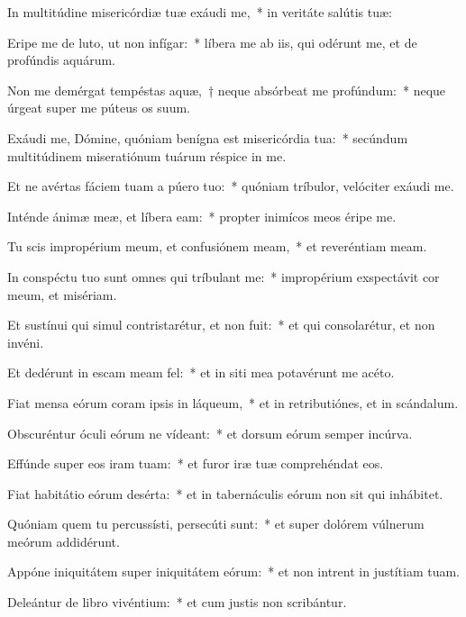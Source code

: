 
\item In multitúdine misericórdiæ tuæ exáudi me,~* in veritáte salútis tuæ:

\item Eripe me de luto, ut non infígar:~* líbera me ab iis, qui odérunt me, et de profúndis aquárum.

\item Non me demérgat tempéstas aquæ,~† neque absórbeat me profúndum:~* neque úrgeat super me púteus os suum.

\item Exáudi me, Dómine, quóniam benígna est misericórdia tua:~* secúndum multitúdinem miseratiónum tuárum réspice in me.

\item Et ne avértas fáciem tuam a púero tuo:~* quóniam tríbulor, velóciter exáudi me.

\item Inténde ánimæ meæ, et líbera eam:~* propter inimícos meos éripe me.

\item Tu scis impropérium meum, et confusiónem meam,~* et reveréntiam meam.

\item In conspéctu tuo sunt omnes qui tríbulant me:~* impropérium exspectávit cor meum, et misériam.

\item Et sustínui qui simul contristarétur, et non fuit:~* et qui consolarétur, et non invéni.

\item Et dedérunt in escam meam fel:~* et in siti mea potavérunt me acéto.

\item Fiat mensa eórum coram ipsis in láqueum,~* et in retributiónes, et in scándalum.

\item Obscuréntur óculi eórum ne vídeant:~* et dorsum eórum semper incúrva.

\item Effúnde super eos iram tuam:~* et furor iræ tuæ comprehéndat eos.

\item Fiat habitátio eórum desérta:~* et in tabernáculis eórum non sit qui inhábitet.

\item Quóniam quem tu percussísti, persecúti sunt:~* et super dolórem vúlnerum meórum addidérunt.

\item Appóne iniquitátem super iniquitátem eórum:~* et non intrent in justítiam tuam.

\item Deleántur de libro vivéntium:~* et cum justis non scribántur.
